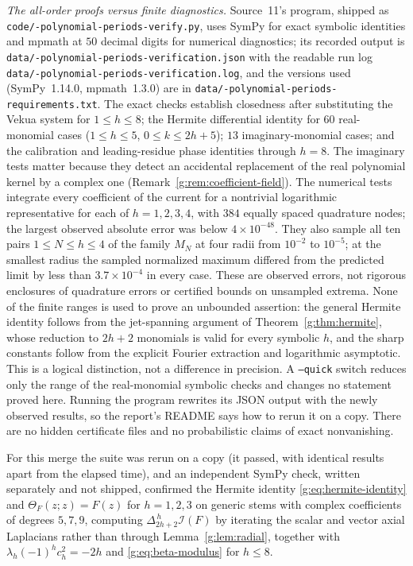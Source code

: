 \documentclass[11pt,a4paper]{article}
\numberwithin{equation}{section}
\theoremstyle{definition}
\theoremstyle{remark}
\theoremstyle{plain}
\newcommand{\I}{\mathcal I}
\newcommand{\lapH}{\Delta_{2h+2}^{\,h}}
\newcommand{\Herm}{\Theta}                        %
\newcommand{\hy}{-\allowbreak}                 %
\begin{document}
\emph{The all-order proofs versus finite diagnostics.} Source~11's program,
shipped as \texttt{code/\hy polynomial\hy periods\hy verify.py}, uses SymPy for exact
symbolic identities and mpmath at $50$ decimal digits for numerical
diagnostics; its recorded output is
\texttt{data/\hy polynomial\hy periods\hy verification.json} with the readable run
log \texttt{data/\hy polynomial\hy periods\hy verification.log}, and the versions
used (SymPy~1.14.0, mpmath~1.3.0) are in
\texttt{data/\hy polynomial\hy periods\hy requirements.txt}. The exact checks
establish closedness after substituting the Vekua system for $1\le h\le8$; the
Hermite differential identity for $60$ real-monomial cases ($1\le h\le5$,
$0\le k\le2h+5$); $13$ imaginary-monomial cases; and the calibration and
leading-residue phase identities through $h=8$. The imaginary tests matter
because they detect an accidental replacement of the real polynomial kernel
by a complex one (Remark~\ref{g:rem:coefficient-field}). The numerical tests
integrate every coefficient of the current for a nontrivial logarithmic
representative for each of $h=1,2,3,4$, with $384$ equally spaced quadrature
nodes; the largest observed absolute error was below $4\times10^{-48}$. They
also sample all ten pairs $1\le N\le h\le4$ of the family $M_N$ at four radii
from $10^{-2}$ to $10^{-5}$; at the smallest radius the sampled normalized
maximum differed from the predicted limit by less than $3.7\times10^{-4}$ in
every case. These are observed errors, not rigorous enclosures of quadrature
errors or certified bounds on unsampled extrema. None of the finite ranges is
used to prove an unbounded assertion: the general Hermite identity follows
from the jet-spanning argument of Theorem~\ref{g:thm:hermite}, whose reduction
to $2h+2$ monomials is valid for every symbolic $h$, and the sharp constants
follow from the explicit Fourier extraction and logarithmic asymptotic. This
is a logical distinction, not a difference in precision. A \texttt{--quick}
switch reduces only the range of the real-monomial symbolic checks and
changes no statement proved here. Running the program rewrites its JSON output
with the newly observed results, so the report's README says how to rerun it on
a copy. There are no hidden certificate files and no probabilistic claims of
exact nonvanishing.

For this merge the suite was rerun on a copy (it passed, with identical
results apart from the elapsed time), and an independent SymPy check, written
separately and not shipped, confirmed the Hermite identity
\eqref{g:eq:hermite-identity} and $\Herm_F(z;z)=F(z)$ for $h=1,2,3$ on generic
stems with complex coefficients of degrees $5,7,9$, computing $\lapH\I(F)$ by
iterating the scalar and vector axial Laplacians rather than through
Lemma~\ref{g:lem:radial}, together with $\lambda_h(-1)^hc_h^2=-2h$ and
\eqref{g:eq:beta-modulus} for $h\le8$.
\end{document}
